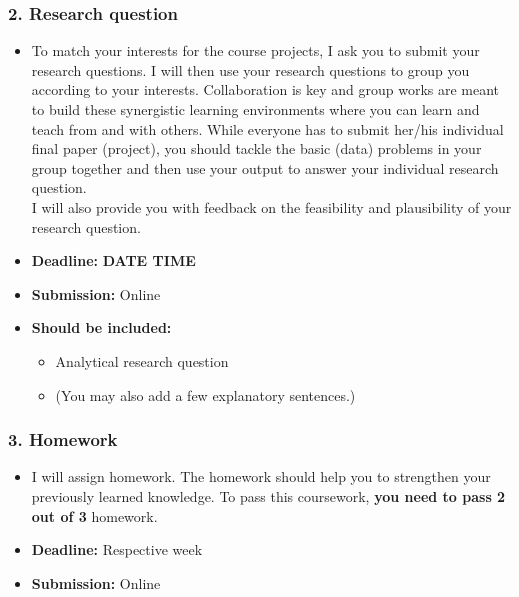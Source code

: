 \documentclass[12pt, a4paper]{article}
\begin{document}
\subsubsection*{2. Research question}
\begin{itemize}
\item[] To match your interests for the course projects, I ask you to submit your research questions. I will then use your research questions to group you according to your interests. Collaboration is key and group works are meant to build these synergistic learning environments where you can learn and teach from and with others. While everyone has to submit her/his individual final paper (project), you should tackle the basic (data) problems in your group together and then use your output to answer your individual research question.\\
I will also provide you with feedback on the feasibility and plausibility of your research question.
 \item[] \textbf{Deadline:} \textbf{\textbf{DATE} \textbf{TIME}}
 \item[] \textbf{Submission:} Online
  \item[] \textbf{Should be included:}
  \begin{itemize}
      \item[-] Analytical research question 
      \item[-] (You may also add a few explanatory sentences.) 
  \end{itemize}
      \end{itemize}
      
\subsubsection*{3. Homework}
\begin{itemize}
\item[] I will assign homework. The homework should help you to strengthen your previously learned knowledge. To pass this coursework, \textbf{you need to pass 2 out of 3} homework.
\item[] \textbf{Deadline:} Respective week
\item[] \textbf{Submission:} Online
\end{itemize}      
\end{document}

